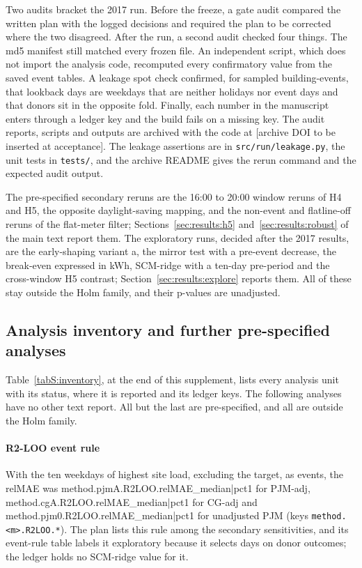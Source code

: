 Two audits bracket the 2017 run. Before the freeze, a gate audit compared the written plan with the logged decisions and required the plan to be corrected where the two disagreed. After the run, a second audit checked four things. The md5 manifest still matched every frozen file. An independent script, which does not import the analysis code, recomputed every confirmatory value from the saved event tables. A leakage spot check confirmed, for sampled building-events, that lookback days are weekdays that are neither holidays nor event days and that donors sit in the opposite fold. Finally, each number in the manuscript enters through a ledger key and the build fails on a missing key. The audit reports, scripts and outputs are archived with the code at [archive DOI to be inserted at acceptance]. The leakage assertions are in \texttt{src/run/leakage.py}, the unit tests in \texttt{tests/}, and the archive README gives the rerun command and the expected audit output.

The pre-specified secondary reruns are the 16:00 to 20:00 window reruns of H4 and H5, the opposite daylight-saving mapping, and the non-event and flatline-off reruns of the flat-meter filter; Sections~\ref{sec:results:h5} and~\ref{sec:results:robust} of the main text report them. The exploratory runs, decided after the 2017 results, are the early-shaping variant a, the mirror test with a pre-event decrease, the break-even expressed in kWh, SCM-ridge with a ten-day pre-period and the cross-window H5 contrast; Section~\ref{sec:results:explore} reports them. All of these stay outside the Holm family, and their p-values are unadjusted.

\subsection{Analysis inventory and further pre-specified analyses}\label{sec:S1:inventory}

Table~\ref{tabS:inventory}, at the end of this supplement, lists every analysis unit with its status, where it is reported and its ledger keys. The following analyses have no other text report. All but the last are pre-specified, and all are outside the Holm family.

\paragraph{R2-LOO event rule} With the ten weekdays of highest site load, excluding the target, as events, the relMAE was {{method.pjmA.R2LOO.relMAE_median|pct1}} for PJM-adj, {{method.cgA.R2LOO.relMAE_median|pct1}} for CG-adj and {{method.pjm0.R2LOO.relMAE_median|pct1}} for unadjusted PJM (keys \texttt{method.<m>.R2LOO.*}). The plan lists this rule among the secondary sensitivities, and its event-rule table labels it exploratory because it selects days on donor outcomes; the ledger holds no SCM-ridge value for it.

